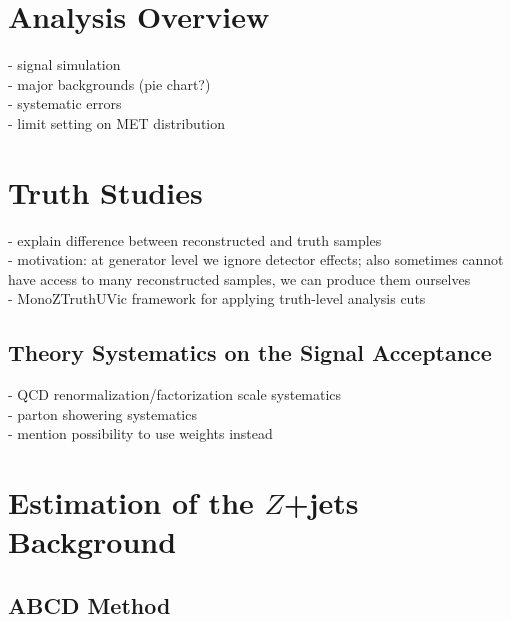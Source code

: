 \label{chapter:prevWork}

\section{Analysis Overview}

- signal simulation\\
- major backgrounds (pie chart?)\\
- systematic errors\\
- limit setting on MET distribution\\

\section{Truth Studies} 

- explain difference between reconstructed and truth samples\\
- motivation: at generator level we ignore detector effects; also sometimes cannot have access to many reconstructed samples, we can produce them ourselves\\
- MonoZTruthUVic framework for applying truth-level analysis cuts\\

\subsection{Theory Systematics on the Signal Acceptance}
- QCD renormalization/factorization scale systematics\\
- parton showering systematics\\
- mention possibility to use weights instead\\

\section{Estimation of the $Z$+jets Background}

\subsection{ABCD Method}

